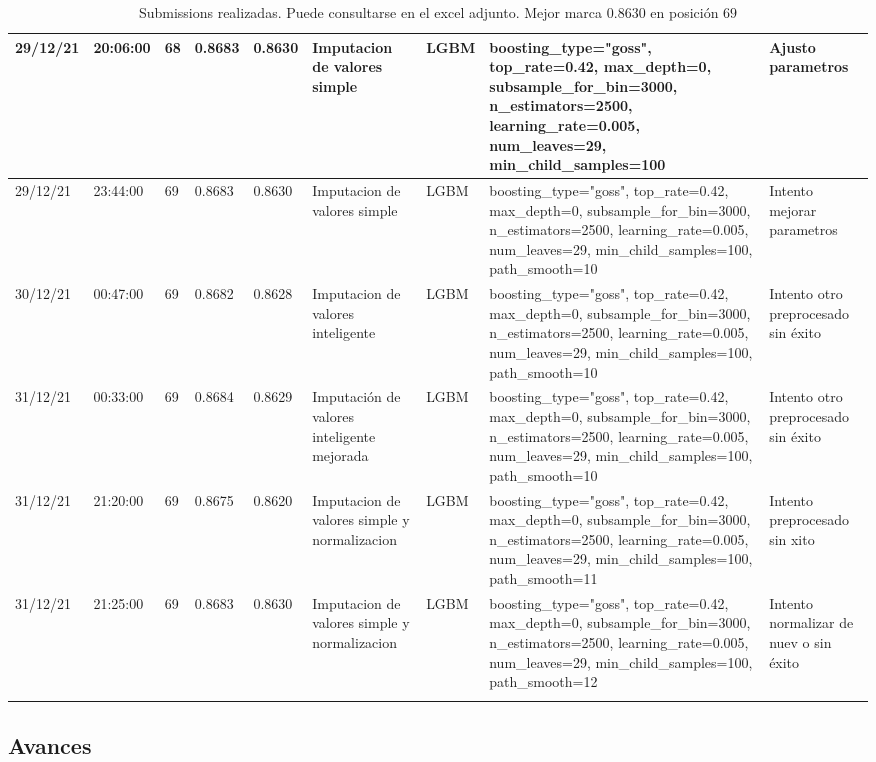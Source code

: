 \documentclass[twoside,openright,titlepage,numbers=noenddot,openany,headinclude,footinclude=true,
cleardoublepage=empty,abstractoff,BCOR=5mm,paper=a4,fontsize=12pt,main=spanish]{scrreprt}
\begin{document}
\begin{longtable}{|l|l|l|l|l|m{7em}|m{7em}|m{7em}|m{7em}|}
        29/12/21 & 20:06:00 & 68 & 0.8683 & 0.8630 & Imputacion de valores simple & LGBM & boosting\_type="goss", top\_rate=0.42, max\_depth=0, subsample\_for\_bin=3000, n\_estimators=2500, learning\_rate=0.005, num\_leaves=29, min\_child\_samples=100 & Ajusto parametros \\ \hline
        29/12/21 & 23:44:00 & 69 & 0.8683 & 0.8630 & Imputacion de valores simple & LGBM & boosting\_type="goss", top\_rate=0.42, max\_depth=0, subsample\_for\_bin=3000, n\_estimators=2500, learning\_rate=0.005, num\_leaves=29, min\_child\_samples=100, path\_smooth=10 & Intento mejorar parametros \\ \hline
        30/12/21 & 00:47:00 & 69 & 0.8682 & 0.8628 & Imputacion de valores inteligente & LGBM & boosting\_type="goss", top\_rate=0.42, max\_depth=0, subsample\_for\_bin=3000, n\_estimators=2500, learning\_rate=0.005, num\_leaves=29, min\_child\_samples=100, path\_smooth=10 & Intento otro preprocesado sin éxito \\ \hline
        31/12/21 & 00:33:00 & 69 & 0.8684 & 0.8629 & Imputación de valores inteligente mejorada & LGBM & boosting\_type="goss", top\_rate=0.42, max\_depth=0, subsample\_for\_bin=3000, n\_estimators=2500, learning\_rate=0.005, num\_leaves=29, min\_child\_samples=100, path\_smooth=10 & Intento otro preprocesado sin éxito \\ \hline
        31/12/21 & 21:20:00 & 69 & 0.8675 & 0.8620 & Imputacion de valores simple y normalizacion & LGBM & boosting\_type="goss", top\_rate=0.42, max\_depth=0, subsample\_for\_bin=3000, n\_estimators=2500, learning\_rate=0.005, num\_leaves=29, min\_child\_samples=100, path\_smooth=11 & Intento preprocesado sin xito \\ \hline
        31/12/21 & 21:25:00 & 69 & 0.8683 & 0.8630 & Imputacion de valores simple y normalizacion & LGBM & boosting\_type="goss", top\_rate=0.42, max\_depth=0, subsample\_for\_bin=3000, n\_estimators=2500, learning\_rate=0.005, num\_leaves=29, min\_child\_samples=100, path\_smooth=12 & Intento normalizar de nuev o sin éxito \\ \hline

\caption{Submissions realizadas. Puede consultarse en el excel adjunto. Mejor marca $0.8630$ en posición $69$}
\label{tabla}

\end{longtable}

\normalsize

\subsection{Avances}
\end{document}
